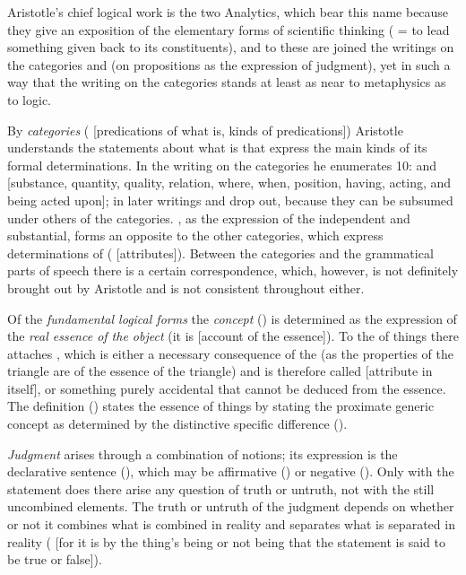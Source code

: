 Aristotle's chief logical work is the two Analytics, which bear this
name because they give an exposition of the elementary forms of
scientific thinking ( = to lead something given back to
its constituents), and to these are joined the writings on the
categories and  (on propositions as the expression
of judgment), yet in such a way that the writing on the categories
stands at least as near to metaphysics as to logic.

By \emph{categories} (
[predications of what is, kinds of predications]) Aristotle understands
the statements about what is that express the main kinds of its formal
determinations. In the writing on the categories he enumerates 10:
  and  [substance, quantity, quality, relation,
where, when, position, having, acting, and being acted upon]; in later
writings  and  drop out, because they can be
subsumed under others of the categories. , as the expression
of the independent and substantial, forms an opposite to the other
categories, which express determinations of 
( [attributes]). Between the categories and the
grammatical parts of speech there is a certain correspondence, which,
however, is not definitely brought out by Aristotle and is not
consistent throughout either.

Of the \emph{fundamental logical forms} the \emph{concept}
() is determined as the expression of the \emph{real essence
of the object} (it is  [account of the essence]).
To the  of things there attaches  ,
which is either a necessary consequence of the  (as the
properties of the triangle are of the essence of the triangle) and is
therefore called  [attribute in itself], or
something purely accidental that cannot be deduced from the essence.
The definition () states the essence of things by stating
the proximate generic concept as determined by the distinctive specific
difference ().

\emph{Judgment} arises through a combination of notions; its expression
is the declarative sentence (), which may be affirmative
() or negative (). Only with the statement
does there arise any question of truth or untruth, not with the still
uncombined elements. The truth or untruth of the judgment depends on
whether or not it combines what is combined in reality and separates
what is separated in reality (  [for it is by the thing's being or not
being that the statement is said to be true or false]).

